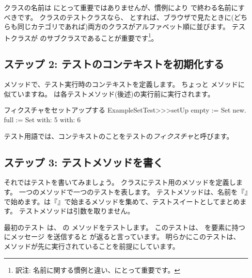 \documentclass[a4paper,10pt,twoside]{book}
\begin{document}
クラスの名前は \sunit にとって重要ではありませんが、慣例により  で終わる名前にすべきです。
 クラスのテストクラスなら、 とすれば、ブラウザで見たときに(どちらも同じカテゴリであれば)両方のクラスがアルファベット順に並びます。
テストクラスが  のサブクラスであることが重要です\footnote{訳注: 名前に関する慣例と違い、\sunit にとって重要です。}。
\subsection{ステップ 2: テストのコンテキストを初期化する}

 メソッドで、テスト実行時のコンテキストを定義します。
ちょっと  メソッドに似ていますね。
 は各テストメソッド(後述)の実行前に実行されます。


\begin{method}[setupExampleSetTest]{フィクスチャをセットアップする}
ExampleSetTest>>>setUp
	empty := Set new.
	full := Set with: 5 with: 6
\end{method}

\noindent
テスト用語では、コンテキストのことをテストの\emph{フィクスチャ}と呼びます。

\subsection{ステップ 3: テストメソッドを書く}

それではテストを書いてみましょう。
 クラスにテスト用のメソッドを定義します。
一つのメソッドで一つのテストを表します。
テストメソッドは、名前を『』で始めます。\sunit は『』で始まるメソッドを集めて、テストスイートとしてまとめます。
テストメソッドは引数を取りません。

最初のテスト  は、 の  メソッドをテストします。
このテストは、 を要素に持つ  にメッセージ  を送信すると  が返ると言っています。
明らかにこのテストは、 メソッドが先に実行されていることを前提にしています。
\end{document}
